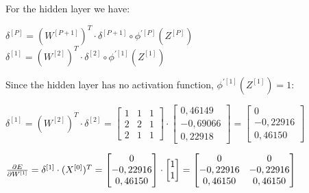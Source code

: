 \documentclass[12pt]{article}
\begin{document}
\begin{enumerate}[leftmargin=\labelsep, label=\textbf{\arabic*.)}]
\begin{itemize}
\begin{center}
                        For the hidden layer we have:
                        \vspace{0.5em}

                        $\delta^{[P]} = (W^{[P+1]})^{T} \cdot \delta^{[P+1]} \circ \phi^{\prime[P]}(Z^{[P]})$ \hspace{2em}
                        $\delta^{[1]} = (W^{[2]})^{T} \cdot \delta^{[2]} \circ \phi^{\prime[1]}(Z^{[1]})$
                        \vspace{0.5em}

                        Since the hidden layer has no activation function, $\phi^{\prime[1]}(Z^{[1]}) = 1$:
                        \vspace{0.5em}

                        $\delta^{[1]} = (W^{[2]})^{T} \cdot \delta^{[2]} = \begin{bmatrix}
                                1 & 1 & 1 \\
                                2 & 2 & 1 \\
                                2 & 1 & 1
                            \end{bmatrix} \cdot \begin{bmatrix}
                                0,46149  \\
                                -0,69066 \\
                                0,22918
                            \end{bmatrix} = \begin{bmatrix}
                                0        \\
                                -0,22916 \\
                                0,46150
                            \end{bmatrix}$
                        \vspace{0.5em}

                        $\pdv{E}{W^{[1]}} = \delta^{[1]} \cdot (X^{[0]})^{T} = \begin{bmatrix}
                                0        \\
                                -0,22916 \\
                                0,46150
                            \end{bmatrix} \cdot \begin{bmatrix}
                                1 \\
                                1
                            \end{bmatrix} = \begin{bmatrix}
                                0        & 0        \\
                                -0,22916 & -0,22916 \\
                                0,46150  & 0,46150
                            \end{bmatrix}$


\end{center}
\end{itemize}
\end{enumerate}
\end{document}
